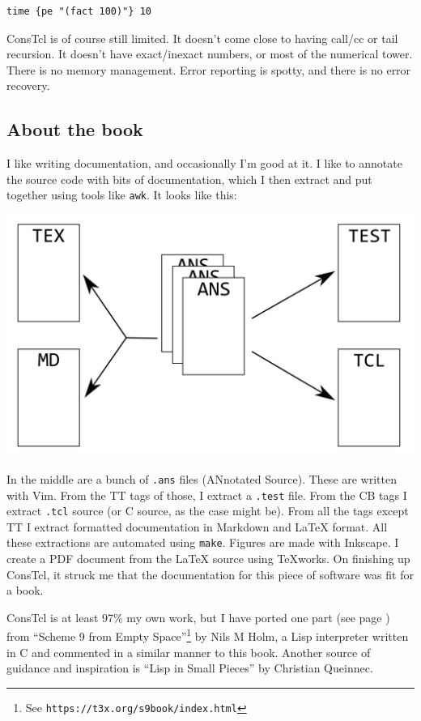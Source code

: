 \documentclass[twoside,9pt]{report}
\begin{document}
\begin{verbatim}
time {pe "(fact 100)"} 10
\end{verbatim}

ConsTcl is of course still limited. It doesn't come close to having call/cc or
tail recursion. It doesn't have exact/inexact numbers, or most of the numerical
tower. There is no memory management. Error reporting is spotty, and there is no
error recovery.

\subsection{About the book}
\label{about-the-book}


I like writing documentation, and occasionally I'm good at it. I like to
annotate the source code with bits of documentation, which I then extract and
put together using tools like \texttt{awk}. It looks like this:

\includegraphics{images/document.png}

In the middle are a bunch of \texttt{.ans} files (ANnotated Source). These are
written with Vim. From the TT tags of those, I extract a \texttt{.test} file.
From the CB tags I extract \texttt{.tcl} source (or C source, as the case might
be). From all the tags except TT I extract formatted documentation in Markdown
and \LaTeX{} format. All these extractions are automated using \texttt{make}.
Figures are made with Inkscape.  I create a PDF document from the \LaTeX{}
source using TeXworks. On finishing up ConsTcl, it struck me that the
documentation for this piece of software was fit for a book.

ConsTcl is at least 97\% my own work, but I have ported one part (see page
\pageref{resolving-local-defines}) from ``Scheme 9 from Empty
Space''\footnote{See \texttt{https://t3x.org/s9book/index.html}} by Nils M
Holm, a Lisp interpreter written in C and commented in a similar manner to this
book. Another source of guidance and inspiration is ``Lisp in Small Pieces'' by
Christian Queinnec.
\end{document}
